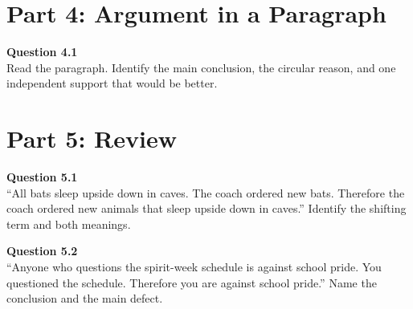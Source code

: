 \documentclass[12pt]{article}
\begin{document}

\newpage

\section*{Part 4: Argument in a Paragraph}

\textbf{Question 4.1}\\[-0.15em]
Read the paragraph. Identify the main conclusion, the circular reason, and one independent support that would be better.

\vspace{0.2em}

\noindent{}


\newpage

\section*{Part 5: Review}

\textbf{Question 5.1}\\[-0.15em]
``All bats sleep upside down in caves. The coach ordered new bats. Therefore the coach ordered new animals that sleep upside down in caves.'' Identify the shifting term and both meanings.


\textbf{Question 5.2}\\[-0.15em]
``Anyone who questions the spirit-week schedule is against school pride. You questioned the schedule. Therefore you are against school pride.'' Name the conclusion and the main defect.

\end{document}
